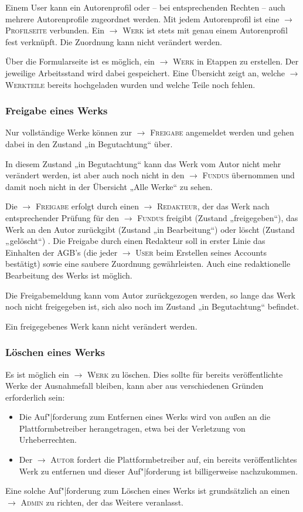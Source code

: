 \documentclass[a4paper,11pt]{article}
\newcommand{\glossar}[1]{{$\to$ \textsc{#1}}}
\begin{document}
Einem User kann ein Autorenprofil oder -- bei entsprechenden Rechten -- auch
mehrere Autorenprofile zugeordnet werden.  Mit jedem Autorenprofil ist eine
\glossar{Profilseite} verbunden.  Ein \glossar{Werk} ist stets mit genau einem
Autorenprofil fest verknüpft. Die Zuordnung kann nicht verändert werden.

Über die Formularseite ist es möglich, ein \glossar{Werk} in Etappen zu
erstellen. Der jeweilige Arbeitsstand wird dabei gespeichert. Eine Übersicht
zeigt an, welche \glossar{Werkteile} bereits hochgeladen wurden und welche
Teile noch fehlen.

\subsubsection{Freigabe eines Werks}

Nur vollständige Werke können zur \glossar{Freigabe} angemeldet werden und
gehen dabei in den Zustand „in Begutachtung“ über.  

In diesem Zustand „in Begutachtung“ kann das Werk vom Autor nicht mehr
verändert werden, ist aber auch noch nicht in den \glossar{Fundus} übernommen
und damit noch nicht in der Übersicht „Alle Werke“ zu sehen.

Die \glossar{Freigabe} erfolgt durch einen \glossar{Redakteur}, der das Werk
nach entsprechender Prüfung für den \glossar{Fundus} freigibt (Zustand
„freigegeben“), das Werk an den Autor zurückgibt (Zustand „in Bearbeitung“)
oder löscht (Zustand „gelöscht“) . Die Freigabe durch einen Redakteur soll in
erster Linie das Einhalten der AGB's (die jeder \glossar{User} beim Erstellen
seines Accounts bestätigt) sowie eine saubere Zuordnung gewährleisten.  Auch
eine redaktionelle Bearbeitung des Werks ist möglich.

Die Freigabemeldung kann vom Autor zurückgezogen werden, so lange das Werk noch
nicht freigegeben ist, sich also noch im Zustand „in Begutachtung“ befindet.

Ein freigegebenes Werk kann nicht verändert werden. 

\subsubsection{Löschen eines Werks}\label{werk.loeschen}

Es ist möglich ein \glossar{Werk} zu löschen. Dies sollte für bereits
veröffentlichte Werke der Ausnahmefall bleiben, kann aber aus verschiedenen
Gründen erforderlich sein:
\begin{itemize}
\item Die Auf"|forderung zum Entfernen eines Werks wird von außen an die
  Plattformbetreiber herangetragen, etwa bei der Verletzung von
  Urheberrechten.
\item Der \glossar{Autor} fordert die Plattformbetreiber auf, ein bereits
  veröffentlichtes Werk zu entfernen und dieser Auf"|forderung ist
  billigerweise nachzukommen.
\end{itemize}
Eine solche Auf"|forderung zum Löschen eines Werks ist grundsätzlich an einen
\glossar{Admin} zu richten, der das Weitere veranlasst.
\end{document}
